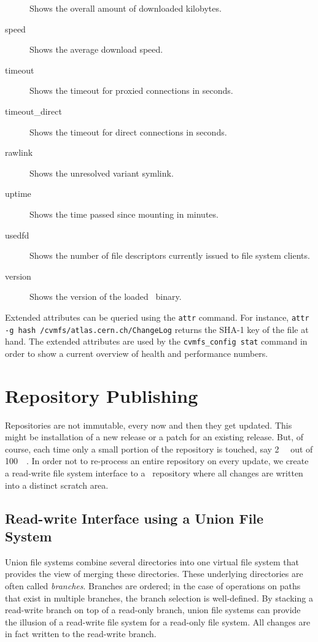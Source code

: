 \begin{description}
		Shows the overall amount of downloaded kilobytes.
	\item[speed]
		Shows the average download speed.
	\item[timeout]
		Shows the timeout for proxied connections in seconds.
	\item[timeout\_direct]
		Shows the timeout for direct connections in seconds.
	\item[rawlink]
		Shows the unresolved variant symlink.	
	\item[uptime]
		Shows the time passed since mounting in minutes.
	\item[usedfd]
		Shows the number of file descriptors currently issued to file system clients.		
	\item[version]
		Shows the version of the loaded \cvmfs\ binary.	
\end{description}

Extended attributes can be queried using the \texttt{attr} command.
For instance, \texttt{attr -g hash /cvmfs/atlas.cern.ch/ChangeLog} returns the SHA-1 key of the file at hand.
The extended attributes are used by the \texttt{cvmfs\_config stat} command in order to show a current overview of health and performance numbers.


\section{Repository Publishing}

Repositories are not immutable, every now and then they get updated. 
This might be installation of a new release or a patch for an existing release.  
But, of course, each time only a small portion of the repository is touched, say \SI{2}{\giga\byte} out of \SI{100}{\giga\byte}.
In order not to re-process an entire repository on every update, we create a read-write file system interface to a \cvmfs\ repository where all changes are written into a distinct scratch area.

\subsection{Read-write Interface using a Union File System}
Union file systems combine several directories into one virtual file system that provides the view of merging these directories.
These underlying directories are often called \emph{branches}.
Branches are ordered; in the case of operations on paths that exist in multiple branches, the branch selection is well-defined.
By stacking a read-write branch on top of a read-only branch, union file systems can provide the illusion of a read-write file system for a read-only file system.
All changes are in fact written to the read-write branch.

